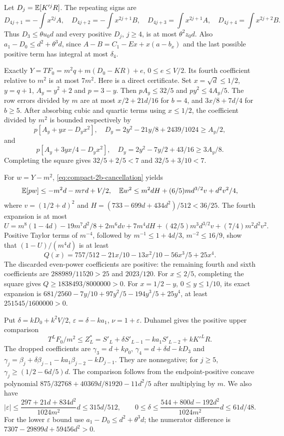 Let $D_j=\mathbb E[K'^jR]$. The repeating signs are
\[
 D_{4j+1}=-\int x^{2j}A,\quad D_{4j+2}=-\int x^{2j+1}B,
 \quad D_{4j+3}=\int x^{2j+1}A,\quad D_{4j+4}=\int x^{2j+2}B.
\]
Thus $D_3\le\theta u_0d$ and every positive $D_j$, $j\ge4$,
is at most $\theta^2z_0d$. Also
$a_1-D_0\le d^2+\theta^3d$, since
$A-B=C_1-Ex+x(a-b_x)$ and the last possible positive term has
integral at most $\delta_{4}$.

Exactly $Y=TF_0=m^2q+m(D_0-KR)+e$, $0\le e\le V/2$.
Its fourth coefficient relative to $m^2$ is at most $7m^2$.
Here is a direct certificate. Set $x=\sqrt d\le1/2$, $y=q+1$,
$A_y=y^2+2$ and $p=3-y$. Then $pA_y\le32/5$ and
$py^2\le4A_y/5$. The row errors divided by $m$ are at most
$x/2+21d/16$ for $b=4$, and $3x/8+7d/4$ for $b\ge5$.
After absorbing cubic and quartic terms using $x\le1/2$, the
coefficient divided by $m^2$ is bounded respectively by
\[
 p[A_y+yx-D_yx^2],\quad
 D_y=2y^2-21y/8+2439/1024\ge A_y/2,
\]
and
\[
 p[A_y+3yx/4-D_yx^2],\quad
 D_y=2y^2-7y/2+43/16\ge3A_y/8.
\]
Completing the square gives $32/5+2/5<7$ and $32/5+3/10<7$.

For $w=Y-m^2$, \eqref{eq:compact-2b-cancellation} yields
\[
 \mathbb E[pw]\le-m^2d-m\tau d+V/2,\quad
 \mathbb E w^2\le m^2dH+(6/5)md^{3/2}v+d^2v^2/4,
\]
where $v=(1/2+d)^2$ and $H=(733-699d+434d^2)/512<36/25$.
The fourth expansion is at most
\[
 U=m^8(1-4d)-19m^7d^2/8+2m^6dv+7m^4dH
                         +(42/5)m^3d^{3/2}v+(7/4)m^2d^2v^2.
\]
Positive Taylor terms of $m^{-4}$, followed by
$m^{-1}\le1+4d/3$, $m^{-2}\le16/9$, show that
$(1-U)/(m^4d)$ is at least
\[
 Q(x)=757/512-21x/10-13x^2/10-56x^3/5+25x^4.
\]
The discarded even-power coefficients are positive: the remaining
fourth and sixth coefficients are $288989/11520>25$ and $2023/120$.
For $x\le2/5$, completing the square gives
$Q\ge1838493/8000000>0$.
For $x=1/2-y$, $0\le y\le1/10$, its exact expansion is
$681/2560-7y/10+97y^2/5-194y^3/5+25y^4$,
at least $251545/1600000>0$.

Put $\delta=kD_0+k^2V/2$, $\varepsilon=\delta-ka_1$, $\nu=1+\varepsilon$.
Duhamel gives the positive upper comparison
\[
 T^LF_0/m^2\le Z_L^*=S'_L+\delta S'_{L-1}-ka_1S'_{L-2}+kK'^LR.
\]
The dropped coefficients are
$\gamma_3=d+k\rho_0$, $\gamma_4=d+\delta d-kD_3$ and
$\gamma_j=\beta_j+\delta\beta_{j-1}-ka_1\beta_{j-2}-kD_{j-1}$.
They are nonnegative; for $j\ge5$,
$\gamma_j\ge(1/2-6d/5)d$.
The comparison follows from the endpoint-positive concave polynomial
$875/32768+40369d/81920-11d^2/5$ after multiplying by $m$.
We also have
\[
 |\varepsilon|\le\frac{297+21d+834d^2}{1024m^2}d\le315d/512,
 \qquad0\le\delta\le\frac{544+800d-192d^2}{1024m^2}d\le61d/48.
\]
For the lower $\varepsilon$ bound use $a_1-D_0\le d^2+\theta^3d$;
the numerator difference is $7307-29899d+59456d^2>0$.

